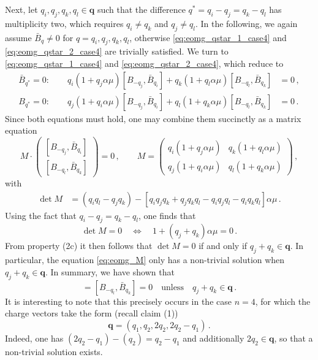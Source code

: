 \documentclass[11pt,a4paper]{article}
\numberwithin{equation}{section}
\numberwithin{table}{section}\setlength{\multlinegap}{25pt}
\begin{document}
Next, let $q_i,q_j,q_k,q_l\in\mathbf{q}$ such that the difference $q^*=q_i-q_j=q_k-q_l$ has multiplicity two, which requires $q_i\neq q_k$ and $q_j\neq q_l$. In the following, we again assume $\bar{B}_{q}\neq 0$ for $q=q_i,q_j,q_k,q_l$, otherwise \eqref{eq:eomg_qstar_1_case4} and \eqref{eq:eomg_qstar_2_case4} are trivially satisfied. We turn to \eqref{eq:eomg_qstar_1_case4} and \eqref{eq:eomg_qstar_2_case4}, which reduce to
\begin{align}
	\text{$\bar{B}_{q^*} = 0$}:\qquad q_i(1+q_j\alpha \mu)[B_{-q_j},\bar{B}_{q_i}]+ q_k(1+q_l\alpha \mu)[B_{-q_l},\bar{B}_{q_k}]&=0\,,\\
	\text{$B_{q^*}=0$}:\qquad q_j(1+q_i\alpha\mu)[B_{-q_j},\bar{B}_{q_i}]+q_l(1+q_k\alpha\mu)[B_{-q_l},\bar{B}_{q_k}]&=0\,.
\end{align}
Since both equations must hold, one may combine them succinctly as a matrix equation
\begin{equation}\label{eq:eomg_M}
	M\cdot \begin{pmatrix}
		[B_{-q_j},\bar{B}_{q_i}]\\ [B_{-q_l},\bar{B}_{q_k}] 
	\end{pmatrix}=0\,,\qquad M = \begin{pmatrix}
		q_i(1+q_j\alpha\mu) & q_k(1+q_l\alpha\mu)\\
		q_j(1+q_i\alpha\mu) & q_l(1+q_k\alpha\mu)
	\end{pmatrix}\,,
\end{equation}
with
\begin{align}
	\det M &= (q_i q_l - q_j q_k) - \left[q_i q_j q_k+q_j q_k q_l - q_i q_j q_l - q_i q_k q_l\right]\alpha\mu\,.
\end{align}
Using the fact that $q_i-q_j=q_k-q_l$, one finds that
\begin{equation}
	\det M = 0\quad\iff\quad 1+(q_j+q_k)\alpha\mu = 0\,.
\end{equation}
From property (2c) it then follows that $\det M=0$ if and only if $q_j+q_k\in\mathbf{q}$. In particular, the equation \eqref{eq:eomg_M} only has a non-trivial solution when $q_j+q_k\in\mathbf{q}$. In summary, we have shown that
\begin{equation}
		[B_{-q_j},\bar{B}_{q_i}] = [B_{-q_l},\bar{B}_{q_k}]=0\quad\text{unless}\quad q_j+q_k\in\mathbf{q}\,.
\end{equation}
It is interesting to note that this precisely occurs in the case $n=4$, for which the charge vectors take the form (recall claim (1))
\begin{equation}
	\mathbf{q} = (q_1, q_2, 2q_2, 2q_2-q_1)\,.
\end{equation}
Indeed, one has $(2q_2-q_1)-(q_2) = q_2-q_1$ and additionally $2q_2\in\mathbf{q}$, so that a non-trivial solution exists. 
\end{document}
